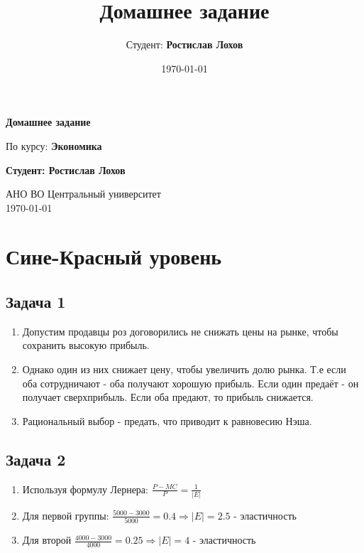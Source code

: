 \documentclass[a4paper,12pt]{article}
\title{Домашнее задание}
\author{Студент: \textbf{Ростислав Лохов}}
\date{\today}
\begin{document}
\begin{titlepage}
    \centering
    \vspace*{1cm}

    \Huge
    \textbf{Домашнее задание}

    \vspace{0.5cm}
    \LARGE
    По курсу: \textbf{Экономика}

    \vspace{1.5cm}

    \textbf{Студент: Ростислав Лохов}

    \vfill

    \Large
    АНО ВО Центральный университет\\
    \vspace{0.3cm}
    \today

\end{titlepage}

\tableofcontents
\newpage

\section{Сине-Красный уровень}

\subsection{Задача 1}
\begin{enumerate}
    \item Допустим продавцы роз договорились не снижать цены на рынке, чтобы сохранить высокую прибыль.
    \item Однако один из них снижает цену, чтобы увеличить долю рынка. Т.е если оба сотрудничают - оба получают хорошую прибыль. Если один предаёт - он получает сверхприбыль. Если оба предают, то прибыль снижается.
    \item Рациональный выбор - предать, что приводит к равновесию Нэша.
\end{enumerate}

\subsection{Задача 2}
\begin{enumerate}
    \item Используя формулу Лернера: $\frac{P-MC}{P}=\frac{1}{|E|}$
    \item Для первой группы: $\frac{5000-3000}{5000}=0.4 \Rightarrow |E| = 2.5$ - эластичность
    \item Для второй $\frac{4000-3000}{4000} = 0.25 \Rightarrow |E|=4$ - эластичность
\end{enumerate}
\end{document}
